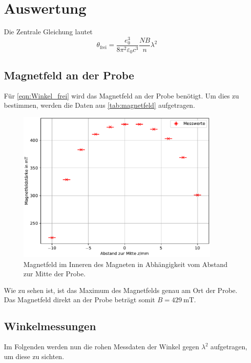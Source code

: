 


\section{Auswertung}
\label{sec:Auswertung}

%
%
%
Die Zentrale Gleichung lautet 
\begin{equation}
    \theta_\text{frei} = \frac{e_0^3}{8 \pi ^2 \varepsilon_0c^3} \frac{NB}{n} \lambda ^2
    \label{eqn:Winkel_frei}
\end{equation}
%
%
%
%

\subsection{Magnetfeld an der Probe}
\noindent Für \autoref{eqn:Winkel_frei} wird das Magnetfeld an der Probe benötigt. Um dies zu bestimmen, 
werden die Daten aus \autoref{tab:magnetfeld} aufgetragen.

\begin{figure}
    \centering
    \includegraphics[width = 0.9\textwidth]{../Magnetfeld.pdf}
    \caption{Magnetfeld im Inneren des Magneten in Abhängigkeit vom Abstand zur Mitte der Probe.}
    \label{fig:magnetfeld}
\end{figure}

\noindent Wie zu sehen ist, ist das Maximum des Magnetfelds genau am Ort der Probe. Das Magnetfeld 
direkt an der Probe beträgt somit 
%
%
$B=\qty{429}{\milli \tesla}$.
%
%
%

\subsection{Winkelmessungen}
\noindent Im Folgenden werden nun die rohen Messdaten der Winkel gegen $\lambda^2$ aufgetragen, um diese 
zu sichten.

